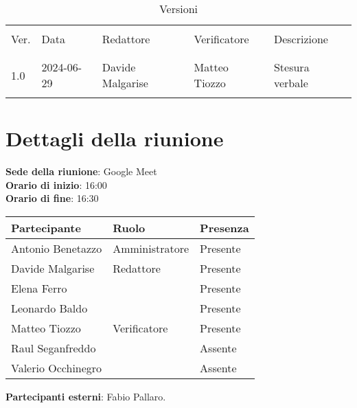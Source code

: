 \documentclass[italian,12pt]{article}
\begin{document}


\newpage



\begin{table}[!h]
	\caption{Versioni}
	\footnotesize
	\begin{center}
		\begin{tabular}{ l l l l p{6cm} }
			\hline                                                                     \\[-2ex]
			Ver. & Data       & Redattore        & Verificatore      & Descrizione     \\
			\\[-2ex] \hline \\[-1.5ex]
			1.0  & 2024-06-29 & Davide Malgarise & Matteo Tiozzo     & Stesura verbale \\
			\\[-1.5ex] \hline
		\end{tabular}
	\end{center}
\end{table}

\newpage

\tableofcontents

\newpage

\section{Dettagli della riunione}

\textbf{Sede della riunione}: Google Meet\\
\textbf{Orario di inizio}: 16:00\\
\textbf{Orario di fine}: 16:30\\

\begin{flushleft}
	\begin{table}[!h]
		\begin{tabular}{ |l|l|l| }
			\hline
			\textbf{Partecipante} & \textbf{Ruolo} & \textbf{Presenza} \\
			\hline
			Antonio Benetazzo     & Amministratore  & Presente          \\
			Davide Malgarise      & Redattore       & Presente          \\
			Elena Ferro           & 			    & Presente          \\
			Leonardo Baldo        &                 & Presente          \\
			Matteo Tiozzo         & Verificatore    & Presente          \\
			Raul Seganfreddo      & 			    & Assente           \\
			Valerio Occhinegro    & 				& Assente           \\
			\hline
		\end{tabular}
	\end{table}
	\textbf{Partecipanti esterni}: Fabio Pallaro.\\
\end{flushleft}
\end{document}
